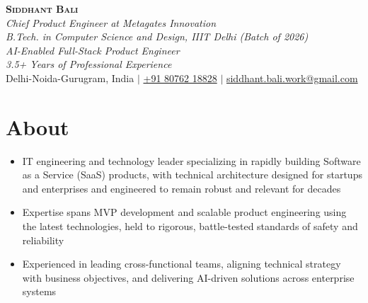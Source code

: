\documentclass[letterpaper,11pt]{article}
\newcommand{\resumeItem}[1]{
  \item\small{
    {#1 \vspace{-2pt}}
  }
}
\newcommand{\resumeItemListStart}{\begin{itemize}}
\newcommand{\resumeItemListEnd}{\end{itemize}\vspace{-5pt}}
\begin{document}

\begin{center}
    \textbf{\Huge \scshape Siddhant Bali} \\ \vspace{1pt}
    {\normalsize\itshape Chief Product Engineer at Metagates Innovation \\
     B.Tech. in Computer Science and Design, IIIT Delhi (Batch of 2026) \\
     AI-Enabled Full-Stack Product Engineer \\
     3.5+ Years of Professional Experience} \\ \vspace{2pt}
    \small Delhi-Noida-Gurugram, India $|$ \href{tel:+918076218828}{+91 80762 18828} $|$ 
    \href{mailto:siddhant.bali.work@gmail.com}{siddhant.bali.work@gmail.com}
\end{center}


\section{About}
\resumeItemListStart
    \resumeItem{IT engineering and technology leader specializing in rapidly building Software as a Service (SaaS) products, with technical architecture designed for startups and enterprises and engineered to remain robust and relevant for decades}
    \resumeItem{Expertise spans MVP development and scalable product engineering using the latest technologies, held to rigorous, battle-tested standards of safety and reliability}
    \resumeItem{Experienced in leading cross-functional teams, aligning technical strategy with business objectives, and delivering AI-driven solutions across enterprise systems}
\resumeItemListEnd
\end{document}
